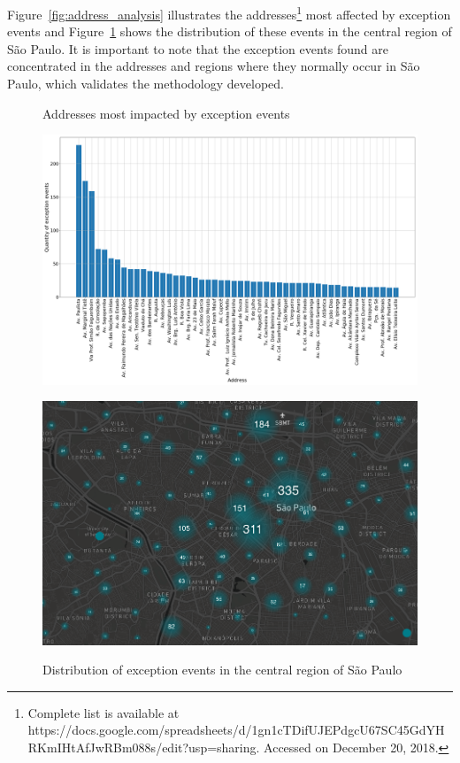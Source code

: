 \documentclass[runningheads]{llncs}
\begin{document}
Figure~\ref{fig:address_analysis} illustrates the addresses\footnote{Complete list is available at https://docs.google.com/spreadsheets/d/\newline1gn1cTDifUJEPdgcU67SC45GdYHRKmIHtAfJwRBm088s/edit?usp=sharing. Accessed on December 20, 2018.} most affected by exception events and Figure~\ref{fig:dispersion} shows the distribution of these events in the central region of São Paulo. It is important to note that the exception events found are concentrated in the addresses and regions where they normally occur in São Paulo, which validates the methodology developed.

\begin{figure}
\centering
\begin{minipage}{.5\textwidth}
  \centering
    \caption{Addresses most impacted by exception events}
    \includegraphics[width=1\linewidth]{address_analysis.png}
  \label{fig:address_analysis}
\end{minipage}%
\begin{minipage}{.5\textwidth}
  \centering
    \caption{Distribution of exception events in the central region of São Paulo}
    \includegraphics[width=1\linewidth]{exception_events_sp.png}
  \label{fig:dispersion}
\end{minipage}
\end{figure}
\end{document}
